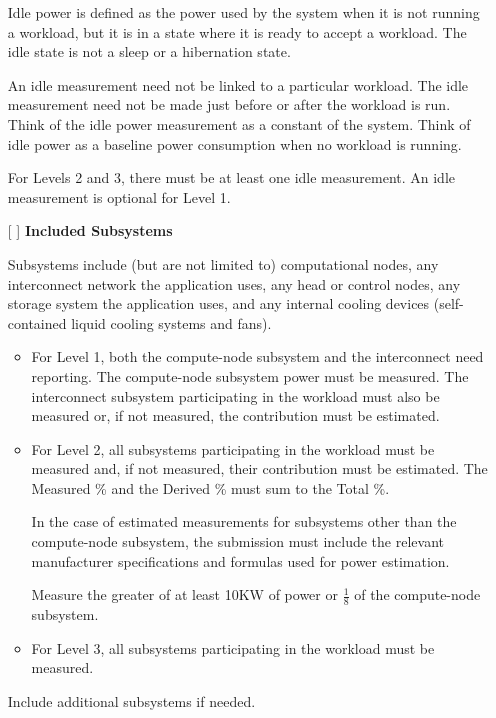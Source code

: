 \begin{itemize}
Idle power is defined as the power used by the system when it is not running a workload, but it is in a state where it is ready to accept a workload. The idle state is not a sleep or a hibernation state.

An idle measurement need not be linked to a particular workload. The idle measurement need not be made just before or after the workload is run. Think of the idle power measurement as a constant of the system. Think of idle power as a baseline power consumption when no workload is running. 

For Levels 2 and 3, there must be at least one idle measurement. An idle measurement is optional for Level 1. 

\newpage
\item[{[ ]}]
\textbf{Included Subsystems}

Subsystems include (but are not limited to) computational nodes, any interconnect network the application uses, any head or control nodes, any storage system the application uses, and any internal cooling devices (self-contained liquid cooling systems and fans).  

\begin{itemize}
\item
For Level 1, both the compute-node subsystem and the interconnect need reporting.  
The compute-node subsystem power must be measured. 
The interconnect subsystem participating in the workload must also be measured or, if not measured, the contribution must be estimated.


\item
For Level 2, all subsystems participating in the workload must be measured and, if not measured, their contribution must be estimated. The Measured \% and the Derived \% must sum to the Total \%.

In the case of estimated measurements for subsystems other than 
the compute-node subsystem, the submission must include the relevant 
manufacturer specifications and formulas used for power estimation. 

Measure the greater of at least 10KW of power or $ \frac{1}{8} $ of the compute-node subsystem.

\item
For Level 3, all subsystems participating in the workload must be measured.
\end{itemize}

Include additional subsystems if needed.


\end{itemize}
